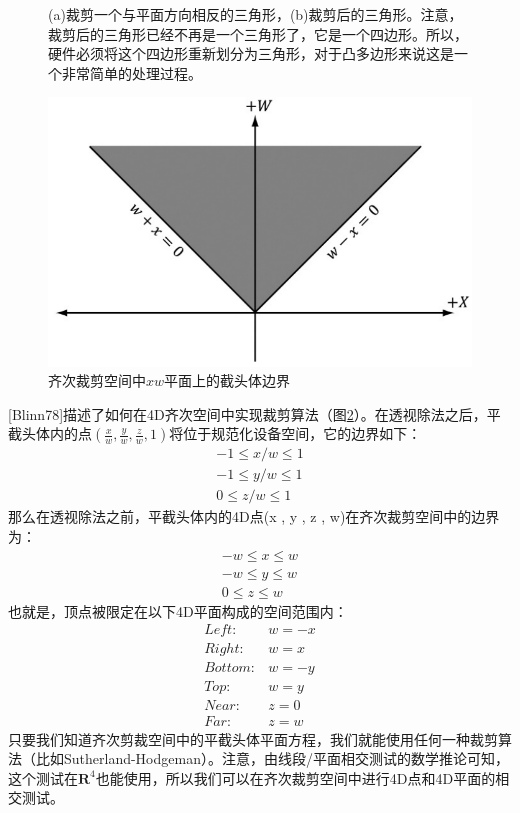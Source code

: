 \documentclass[11pt,a4paper,oldfontcommands]{memoir}
\begin{document}
{\begin{flushleft}
\begin{figure}[h]
    \centering
    \caption{(a)裁剪一个与平面方向相反的三角形，(b)裁剪后的三角形。注意，裁剪后的三角形已经不再是一个三角形了，它是一个四边形。所以，硬件必须将这个四边形重新划分为三角形，对于凸多边形来说这是一个非常简单的处理过程。}
    \label{fig:5-28}
\end{figure}
\begin{figure}[h]
    \includegraphics[width=\textwidth]{5-29}
    \centering
    \caption{齐次裁剪空间中$xw$平面上的截头体边界}
    \label{fig:5-29}
\end{figure}
[Blinn78]描述了如何在4D齐次空间中实现裁剪算法（图\ref{fig:5-29}）。在透视除法之后，平截头体内的点$ (\frac{x}{w},\frac{y}{w},\frac{z}{w},1) $将位于规范化设备空间，它的边界如下：
\begin{align*}
-1\leq x/w \leq 1\\
-1\leq y/w \leq 1\\
0 \leq z/w \leq 1
\end{align*}
那么在透视除法之前，平截头体内的4D点(x , y , z , w)在齐次裁剪空间中的边界为：
\begin{align*}
-w\leq x \leq w\\
-w\leq y \leq w\\
0 \leq z \leq w
\end{align*}
也就是，顶点被限定在以下4D平面构成的空间范围内：
\begin{align*}
\mathit{Left:}&w=-x\\
\mathit{Right:}&w=x\\
\mathit{Bottom:}&w=-y\\
\mathit{Top:}&w=y\\
\mathit{Near:}&z=0\\
\mathit{Far:}&z=w
\end{align*}
只要我们知道齐次剪裁空间中的平截头体平面方程，我们就能使用任何一种裁剪算法（比如Sutherland-Hodgeman）。注意，由线段/平面相交测试的数学推论可知，这个测试在$\mathbf{R}^{4}$也能使用，所以我们可以在齐次裁剪空间中进行4D点和4D平面的相交测试。
\end{flushleft}

}
\end{document}
